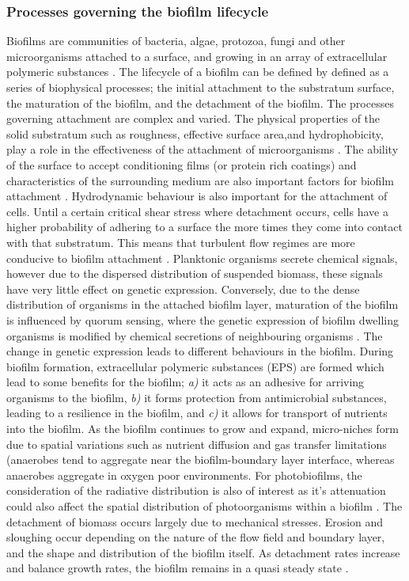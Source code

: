 \subsubsection{Processes governing the biofilm lifecycle} 
Biofilms are communities of bacteria, algae, protozoa, fungi and other microorganisms attached to a surface, and growing in an array of extracellular polymeric substances \cite{VanLoosdrecht2002}.
The lifecycle of a biofilm can be defined by defined as a series of biophysical processes; the initial attachment to the substratum surface, the maturation of the biofilm, and the detachment of the biofilm. The processes governing attachment are complex and varied. The physical properties of the solid substratum such as roughness, effective surface area,and hydrophobicity, play a role in the effectiveness of the attachment of microorganisms \cite{MarshallKevinC1990B/eb}. The ability of the surface to accept conditioning films (or protein rich coatings) and characteristics of the surrounding medium are also important factors for biofilm attachment \cite{Donlan2002}. Hydrodynamic behaviour is also important for the attachment of cells. Until a certain critical shear stress where detachment occurs, cells have a higher probability of adhering to a surface the more times they come into contact with that substratum. This means that turbulent flow regimes are more conducive to biofilm attachment \cite{Rijnaarts1993}.
\skippingparagraph
Planktonic organisms secrete chemical signals, however due to the dispersed distribution of suspended biomass, these signals have very little effect on genetic expression. Conversely, due to the dense distribution of organisms in the attached biofilm layer, maturation of the biofilm is influenced by quorum sensing, where the genetic expression of biofilm dwelling organisms is modified by chemical secretions of neighbouring organisms \cite{Donlan2002}. The change in genetic expression leads to different behaviours in the biofilm. During biofilm formation, extracellular polymeric substances (EPS) are formed which lead to some benefits for the biofilm; \textit{a)} it acts as an adhesive for arriving organisms to the biofilm, \textit{b)} it forms protection from antimicrobial substances, leading to a resilience in the biofilm, and \textit{c)} it allows for transport of nutrients into the biofilm. As the biofilm continues to grow and expand, micro-niches form due to spatial variations such as nutrient diffusion and gas transfer limitations (anaerobes tend to aggregate near the biofilm-boundary layer interface, whereas anaerobes aggregate in oxygen poor environments. For photobiofilms, the consideration of the radiative distribution is also of interest as it's attenuation could also affect the spatial distribution of photoorganisms within a biofilm \cite{Podola2017}.
\skippingparagraph
The detachment of biomass occurs largely due to mechanical stresses. Erosion and sloughing occur depending on the nature of the flow field and boundary layer, and the shape and distribution of the biofilm itself. As detachment rates increase and balance growth rates, the biofilm remains in a quasi steady state \cite{xavier2005, storck2015}.

